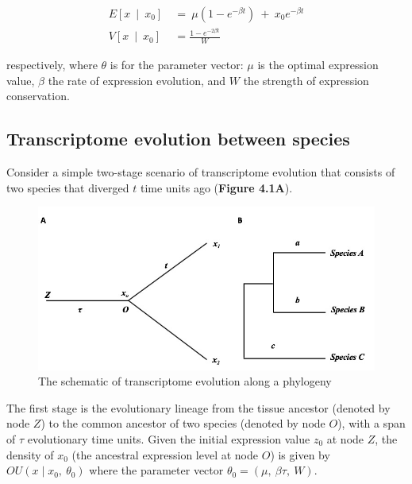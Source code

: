 \documentclass[]{book}
\begin{document}
\[
\begin{split}
E\left[x\  \mid\  x_0\right]\  &=\  \mu\left(1-e^{-\beta t}\right)\  +\  x_0e^{-\beta t} \\
V\left[x\  \mid\  x_0\right]\  &=\frac{1-e^{-2\beta t}}{W}
\end{split}\tag{1.1}
\]

respectively, where \(\theta\) is for the parameter vector: \(\mu\) is the optimal expression value, \(\beta\) the rate of expression evolution, and \(W\) the strength of expression conservation.

\hypertarget{transcriptome-evolution-between-species}{%
\subsection{Transcriptome evolution between species}\label{transcriptome-evolution-between-species}}

Consider a simple two-stage scenario of transcriptome evolution that consists of two species that diverged \(t\) time units ago (\textbf{Figure 4.1A}).

\begin{figure}
\includegraphics[width=0.9\linewidth]{Figure1} \caption{The schematic of transcriptome evolution along a phylogeny}\label{fig:unnamed-chunk-14}
\end{figure}

The first stage is the evolutionary lineage from the tissue ancestor (denoted by node \(Z\)) to the common ancestor of two species (denoted by node \(O\)), with a span of \(\tau\) evolutionary time units. Given the initial expression value \(z_0\) at node \(Z\), the density of \(x_0\) (the ancestral expression level at node \(O\)) is given by \(OU\left(x\mid x_0,\  \theta_0\right)\) where the parameter vector \(\theta_{0}=\left(\mu,\  \beta\tau,\  W\right)\).
\end{document}
